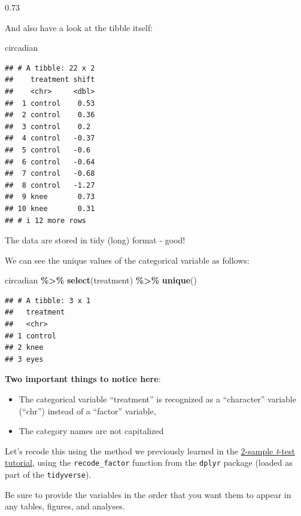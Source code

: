 \documentclass[
]{book}
\newenvironment{Shaded}{\begin{snugshade}}{\end{snugshade}}
\newcommand{\FunctionTok}[1]{\textcolor[rgb]{0.13,0.29,0.53}{\textbf{#1}}}
\newcommand{\NormalTok}[1]{#1}
\newcommand{\SpecialCharTok}[1]{\textcolor[rgb]{0.81,0.36,0.00}{\textbf{#1}}}
\providecommand{\tightlist}{%
  \setlength{\itemsep}{0pt}\setlength{\parskip}{0pt}}
\begin{document}
0.73

And also have a look at the tibble itself:

\begin{Shaded}
\begin{Highlighting}[]
\NormalTok{circadian}
\end{Highlighting}
\end{Shaded}

\begin{verbatim}
## # A tibble: 22 x 2
##    treatment shift
##    <chr>     <dbl>
##  1 control    0.53
##  2 control    0.36
##  3 control    0.2 
##  4 control   -0.37
##  5 control   -0.6 
##  6 control   -0.64
##  7 control   -0.68
##  8 control   -1.27
##  9 knee       0.73
## 10 knee       0.31
## # i 12 more rows
\end{verbatim}

The data are stored in tidy (long) format - good!

We can see the unique values of the categorical variable as follows:

\begin{Shaded}
\begin{Highlighting}[]
\NormalTok{circadian }\SpecialCharTok{\%\textgreater{}\%}
  \FunctionTok{select}\NormalTok{(treatment) }\SpecialCharTok{\%\textgreater{}\%}
  \FunctionTok{unique}\NormalTok{()}
\end{Highlighting}
\end{Shaded}

\begin{verbatim}
## # A tibble: 3 x 1
##   treatment
##   <chr>    
## 1 control  
## 2 knee     
## 3 eyes
\end{verbatim}

\textbf{Two important things to notice here}:

\begin{itemize}
\tightlist
\item
  The categorical variable ``treatment'' is recognized as a ``character'' variable (``chr'') instead of a ``factor'' variable,
\item
  The category names are not capitalized
\end{itemize}

Let's recode this using the method we previously learned in the \hyperref[twosamp_ttest]{2-sample \emph{t}-test tutorial}, using the \texttt{recode\_factor} function from the \texttt{dplyr} package (loaded as part of the \texttt{tidyverse}).

Be sure to provide the variables in the order that you want them to appear in any tables, figures, and analyses.
\end{document}
